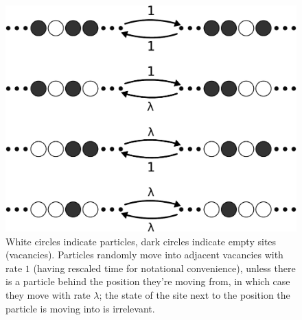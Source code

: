\documentclass[
reprint, amsmath,amssymb,
]{revtex4-1}
\begin{document}
 \begin{figure} \vspace{1em}
\caption{\label{fig:rates} White circles indicate particles, dark circles indicate empty sites (vacancies). Particles randomly move into adjacent vacancies with rate $1$ (having rescaled time for notational convenience), unless there is a particle behind the position they're moving from, in which case they move with rate $\lambda$; the state of the site next to the position the particle is moving into is irrelevant.}
    \includegraphics[width=\linewidth]{ratesDB.pdf}
    \end{figure}
\end{document}
